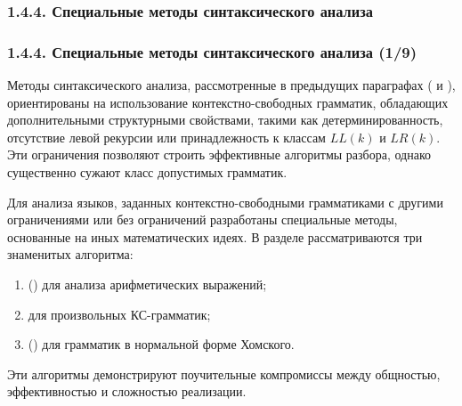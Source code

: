 \subsubsection{1.4.4. Специальные методы синтаксического анализа}
\begin{frame}
\frametitle{1.4.4. Специальные методы синтаксического анализа (1/9)}
Методы синтаксического анализа, рассмотренные в предыдущих параграфах 
( и ), ориентированы на использование контекстно-свободных грамматик, обладающих дополнительными структурными свойствами, такими как детерминированность, отсутствие левой рекурсии или принадлежность к классам $LL(k)$ и $LR(k)$. Эти ограничения позволяют строить эффективные алгоритмы разбора, однако существенно сужают класс допустимых грамматик.

Для анализа языков, заданных контекстно-свободными грамматиками с другими
ограничениями или без ограничений разработаны специальные методы, 
основанные на иных математических идеях. В разделе рассматриваются три 
знаменитых алгоритма:
\begin{enumerate}
    \item {} 
    () 
    для анализа арифметических выражений;
    \item {} для произвольных КС-грамматик;
    \item {} () для грамматик в нормальной форме
    Хомского.
\end{enumerate}

Эти алгоритмы демонстрируют поучительные компромиссы между общностью, эффективностью и сложностью реализации. 
\end{frame}

